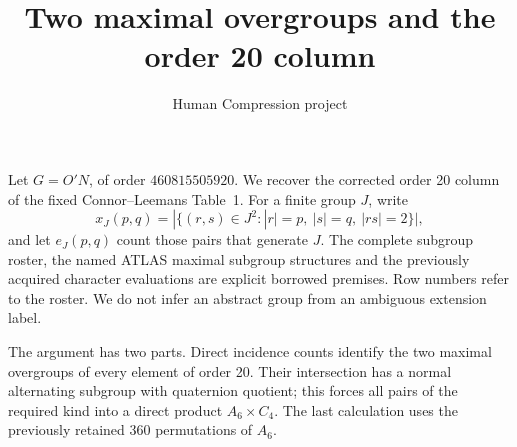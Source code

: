 \documentclass[11pt,a4paper]{article}
\title{Two maximal overgroups and the order 20 column}
\author{Human Compression project}\date{}
\begin{document}
\maketitle
Let $G=O'N$, of order $460815505920$. We recover the corrected order 20 column
of the fixed Connor--Leemans Table~1. For a finite group $J$, write
\[
 x_J(p,q)=|\{(r,s)\in J^2:|r|=p,\ |s|=q,\ |rs|=2\}|,
\]
and let $e_J(p,q)$ count those pairs that generate $J$.
The complete subgroup roster, the named ATLAS maximal subgroup
structures and the previously acquired character evaluations are
explicit borrowed premises. Row numbers refer to the roster.
We do not infer an abstract group from an ambiguous extension label.

The argument has two parts. Direct incidence counts identify the two
maximal overgroups of every element of order 20. Their intersection
has a normal alternating subgroup with quaternion quotient; this
forces all pairs of the required kind into a direct product
$A_6\times C_4$. The last calculation uses the previously retained
360 permutations of $A_6$.
\end{document}
